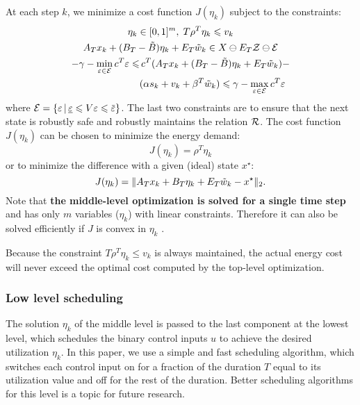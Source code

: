 At each step $k$, we minimize a cost function $J(\eta_{k})$ subject to the constraints:
\begin{gather*}
  \eta_{k} \in [0,1]^{m}, \; T \rho^{T} \eta_{k} \leqslant v_{k} \\
  A_{T} x_{k} + (B_{T} - \tilde{B}) \eta_{k} + E_{T} \tilde{w}_{k} \in X \ominus E_{T} \ZSet \ominus \ESet \\
  \begin{aligned}
    -\gamma - \min_{\varepsilon \in \ESet} c^{T} \varepsilon %
    \leqslant & \, c^{T}(A_{T} x_{k} + (B_{T} - \tilde{B}) \eta_{k}
    + %
    E_{T} \tilde{w}_{k}) - \\
    & (\alpha s_{k} + v_{k} + \beta^{T} \tilde{w}_{k}) \leqslant \gamma
    - \max_{\varepsilon \in \ESet} c^{T}
    \varepsilon %
  \end{aligned}
\end{gather*}
where $\ESet = \{\varepsilon \,|\, \underline{\varepsilon} \leqslant V \varepsilon \leqslant \overbar{\varepsilon}\}$.
The last two constraints are to ensure that the next state is robustly safe and robustly maintains the relation $\mathcal{R}$.
The cost function $J(\eta_{k})$ can be chosen to minimize the energy demand:
\begin{equation*}
  J(\eta_{k}) = \rho^{T} \eta_{k}
\end{equation*}
or to minimize the difference with a given (ideal) state $x^{\star}$:
\begin{equation*}
  J(\eta_{k}) = \| A_{T} x_{k} + B_{T} \eta_{k} + E_{T} \tilde{w}_{k} - x^{\star} \|_{2} \text.
\end{equation*}
%
Note that \textbf{the middle-level optimization is solved for a single time step} and has only $m$ variables ($\eta_{k}$) with linear constraints.
Therefore it can also be solved efficiently if $J$ is convex in $\eta_{k}$ \cite{boydetal06co}.

Because the constraint $T \rho^{T} \eta_{k} \leqslant v_{k}$ is always maintained, the actual energy cost will never exceed the optimal cost computed by the top-level optimization.


\subsubsection{Low level scheduling}

The solution $\eta_{k}$ of the middle level is passed to the last component at the lowest level, which schedules the binary control inputs $u$ to achieve the desired utilization $\eta_{k}$.
In this paper, we use a simple and fast scheduling algorithm, which switches each control input on for a fraction of the duration $T$ equal to its utilization value and off for the rest of the duration.
Better scheduling algorithms for this level is a topic for future research.

